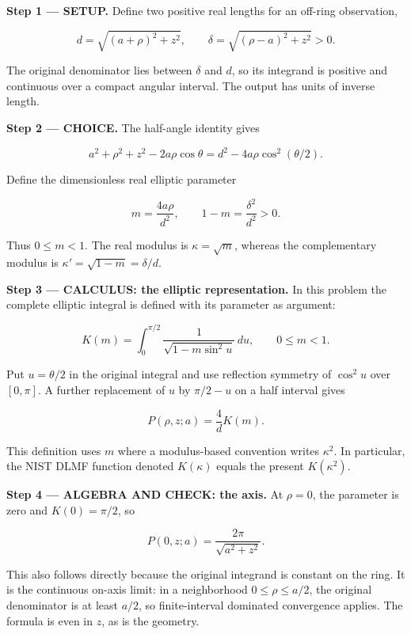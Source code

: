 \documentclass[11pt,oneside,openany]{book}
\begin{document}
\textbf{Step 1 --- SETUP.} Define two positive real lengths for an off-ring observation,

\[
d=\sqrt{(a+\rho)^2+z^2},\qquad
\delta=\sqrt{(\rho-a)^2+z^2}>0.
\]

The original denominator lies between \(\delta\) and \(d\), so its integrand is positive and continuous over a compact angular interval. The output has units of inverse length.

\begin{ChoiceStep}
\textbf{Step 2 --- CHOICE.} The half-angle identity gives

\[
a^2+\rho^2+z^2-2a\rho\cos\theta
=d^2-4a\rho\cos^2(\theta/2).
\]

Define the dimensionless real elliptic parameter

\[
m=\frac{4a\rho}{d^2},\qquad
1-m=\frac{\delta^2}{d^2}>0.
\]

Thus \(0\le m<1\). The real modulus is \(\kappa=\sqrt m\), whereas the complementary modulus is \(\kappa'=\sqrt{1-m}=\delta/d\).

\end{ChoiceStep}
\textbf{Step 3 --- CALCULUS: the elliptic representation.} In this problem the complete elliptic integral is defined with its parameter as argument:

\[
K(m)=\int_0^{\pi/2}\frac1{\sqrt{1-m\sin^2u}}\,du,
\qquad 0\le m<1.
\]

Put \(u=\theta/2\) in the original integral and use reflection symmetry of \(\cos^2u\) over \([0,\pi]\). A further replacement of \(u\) by \(\pi/2-u\) on a half interval gives

\[
P(\rho,z;a)=\frac4dK(m).
\]

This definition uses \(m\) where a modulus-based convention writes \(\kappa^2\). In particular, the NIST DLMF function denoted \(K(\kappa)\) equals the present \(K(\kappa^2)\).

\begingroup\color{AlgebraBlue}
\textbf{Step 4 --- ALGEBRA AND CHECK: the axis.} At \(\rho=0\), the parameter is zero and \(K(0)=\pi/2\), so

\[
P(0,z;a)=\frac{2\pi}{\sqrt{a^2+z^2}}.
\]

This also follows directly because the original integrand is constant on the ring. It is the continuous on-axis limit: in a neighborhood \(0\le\rho\le a/2\), the original denominator is at least \(a/2\), so finite-interval dominated convergence applies. The formula is even in \(z\), as is the geometry.
\end{document}
